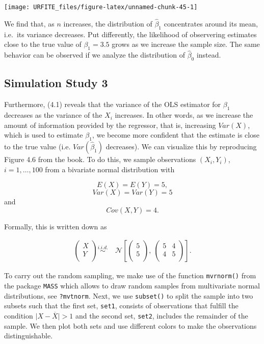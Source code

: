 \documentclass[]{book}
\theoremstyle{definition}
\theoremstyle{definition}
\theoremstyle{definition}
\theoremstyle{remark}
\begin{document}
\begin{center}\texttt{[image: URFITE\_files/figure-latex/unnamed-chunk-45-1]} \end{center}

We find that, as \(n\) increases, the distribution of \(\hat\beta_1\)
concentrates around its mean, i.e.~its variance decreases. Put
differently, the likelihood of observering estimates close to the true
value of \(\beta_1 = 3.5\) grows as we increase the sample size. The
same behavior can be observed if we analyze the distribution of
\(\hat\beta_0\) instead.

\subsection*{Simulation Study 3}\label{simulation-study-3}

Furthermore, (4.1) reveals that the variance of the OLS estimator for
\(\beta_1\) decreases as the variance of the \(X_i\) increases. In other
words, as we increase the amount of information provided by the
regressor, that is, increasing \(Var(X)\), which is used to estimate
\(\beta_1\), we become more confident that the estimate is close to the
true value (i.e. \(Var(\hat\beta_1)\) decreases). We can visualize this
by reproducing Figure 4.6 from the book. To do this, we sample
observations \((X_i,Y_i)\), \(i=1,\dots,100\) from a bivariate normal
distribution with

\[E(X)=E(Y)=5,\] \[Var(X)=Var(Y)=5\] and \[Cov(X,Y)=4.\]

Formally, this is written down as

\begin{align}
  \begin{pmatrix}
    X \\
    Y \\
  \end{pmatrix}
  \overset{i.i.d.}{\sim} & \ \mathcal{N} 
  \left[
    \begin{pmatrix}
      5 \\
      5 \\
    \end{pmatrix}, \ 
    \begin{pmatrix}
      5 & 4 \\
      4 & 5 \\
    \end{pmatrix}
  \right]. \tag{4.3}
\end{align}

To carry out the random sampling, we make use of the function
\texttt{mvrnorm()} from the package \texttt{MASS} \citep{R-MASS} which
allows to draw random samples from multivariate normal distributions,
see \texttt{?mvtnorm}. Next, we use \texttt{subset()} to split the
sample into two subsets such that the first set, \texttt{set1}, consists
of observations that fulfill the condition
\(\lvert X - \overline{X} \rvert > 1\) and the second set,
\texttt{set2}, includes the remainder of the sample. We then plot both
sets and use different colors to make the observations distinguishable.
\end{document}
